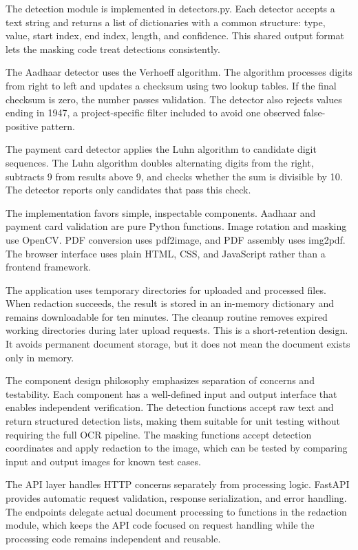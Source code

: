 \bigskip

The detection module is implemented in detectors.py. Each detector accepts a text string and returns a list of dictionaries with a common structure: type, value, start index, end index, length, and confidence. This shared output format lets the masking code treat detections consistently.

The Aadhaar detector uses the Verhoeff algorithm. The algorithm processes digits from right to left and updates a checksum using two lookup tables. If the final checksum is zero, the number passes validation. The detector also rejects values ending in 1947, a project-specific filter included to avoid one observed false-positive pattern.

The payment card detector applies the Luhn algorithm to candidate digit sequences. The Luhn algorithm doubles alternating digits from the right, subtracts 9 from results above 9, and checks whether the sum is divisible by 10. The detector reports only candidates that pass this check.

The implementation favors simple, inspectable components. Aadhaar and payment card validation are pure Python functions. Image rotation and masking use OpenCV. PDF conversion uses pdf2image, and PDF assembly uses img2pdf. The browser interface uses plain HTML, CSS, and JavaScript rather than a frontend framework.

The application uses temporary directories for uploaded and processed files. When redaction succeeds, the result is stored in an in-memory dictionary and remains downloadable for ten minutes. The cleanup routine removes expired working directories during later upload requests. This is a short-retention design. It avoids permanent document storage, but it does not mean the document exists only in memory.

\bigskip

The component design philosophy emphasizes separation of concerns and testability. Each component has a well-defined input and output interface that enables independent verification. The detection functions accept raw text and return structured detection lists, making them suitable for unit testing without requiring the full OCR pipeline. The masking functions accept detection coordinates and apply redaction to the image, which can be tested by comparing input and output images for known test cases.

The API layer handles HTTP concerns separately from processing logic. FastAPI provides automatic request validation, response serialization, and error handling. The endpoints delegate actual document processing to functions in the redaction module, which keeps the API code focused on request handling while the processing code remains independent and reusable.

